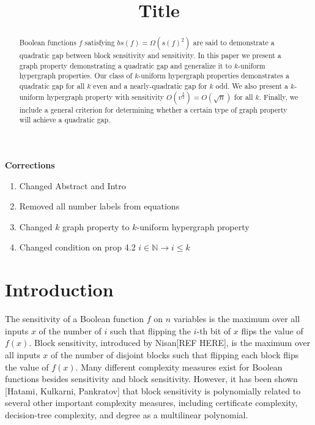 \documentclass[psamsfonts]{amsart}
\theoremstyle{definition}
\theoremstyle{remark}
\numberwithin{equation}{section}
\begin{document}
	\title{Title}
	{\bf Corrections}
	\begin{enumerate}
	\item Changed Abstract and Intro
	\item Removed all number labels from equations
	\item Changed $k$ graph property to $k$-uniform hypergraph property
	\item Changed condition on prop 4.2 $i \in \mathbb{N} \rightarrow i \leq k$
	\end{enumerate}
	
	\begin{abstract}
		 Boolean functions $f$ satisfying $bs(f) = \Omega(s(f)^{2})$ are said to demonstrate a quadratic gap between block sensitivity and sensitivity.  In this paper we present a graph property demonstrating a quadratic gap and generalize it to $k$-uniform hypergraph properties. Our class of $k$-uniform hypergraph properties demonstrates a quadratic gap for all $k$ even and a nearly-quadratic gap for $k$ odd.  We also present a $k$-uniform hypergraph property with sensitivity $O(v^{\frac{k}{2}})=O(\sqrt n)$ for all $k$. Finally, we include a general criterion for determining whether a certain type of graph property will achieve a quadratic gap.  
  
	\end{abstract}
	
	\maketitle
	
	\tableofcontents
	
	\section{Introduction}
The sensitivity of a Boolean function $f$ on $n$ variables is the maximum over all inputs $x$ of the number of $i$ such that flipping the $i$-th bit of $x$ flips the value of $f(x)$. Block sensitivity, introduced by Nisan[REF HERE], is the maximum over all inputs $x$ of the number of disjoint blocks such that flipping each block flips the value of $f(x)$. Many different complexity measures exist for Boolean functions besides sensitivity and block sensitivity.  However, it has been shown [Hatami, Kulkarni, Pankratov] that block sensitivity is polynomially related to several other important complexity measures, including certificate complexity, decision-tree complexity, and degree as a multilinear polynomial. 
\end{document}
